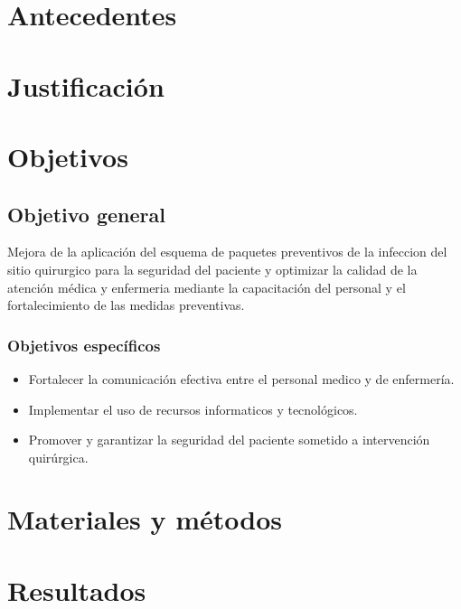\documentclass[12 pt]{report}
\begin{document}
	\section*{Antecedentes} 
	\section*{Justificación} 
	\section*{Objetivos} 
	
	\subsection*{Objetivo general} 
	Mejora de la aplicación del esquema de paquetes preventivos de la infeccion del sitio quirurgico para la seguridad del paciente y optimizar la calidad de la atención médica y enfermeria mediante la capacitación del personal y el fortalecimiento de las medidas preventivas.
	
	\subsubsection*{Objetivos específicos} 
	\begin{itemize}
		\item Fortalecer la comunicación efectiva entre el personal medico y de enfermería. 
		\item Implementar el uso de recursos informaticos y tecnológicos. 
		\item Promover y garantizar la seguridad del paciente sometido a intervención quirúrgica.	
	\end{itemize}
	
	\section*{Materiales y métodos} 
	
	\section*{Resultados} 
	
\end{document}

